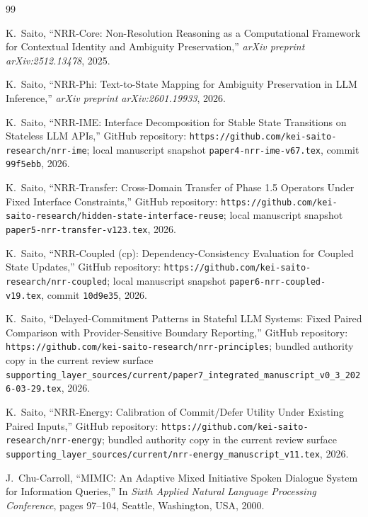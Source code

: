 \documentclass[11pt]{article}
\begin{document}
\begin{thebibliography}{99}
\raggedright

K.~Saito,
\newblock ``NRR-Core: Non-Resolution Reasoning as a Computational Framework for Contextual Identity and Ambiguity Preservation,''
\newblock \emph{arXiv preprint arXiv:2512.13478}, 2025.

K.~Saito,
\newblock ``NRR-Phi: Text-to-State Mapping for Ambiguity Preservation in LLM Inference,''
\newblock \emph{arXiv preprint arXiv:2601.19933}, 2026.

K.~Saito,
\newblock ``NRR-IME: Interface Decomposition for Stable State Transitions on Stateless LLM APIs,''
\newblock GitHub repository: \texttt{https://github.com/kei-saito-research/nrr-ime}; local manuscript snapshot \texttt{paper4-nrr-ime-v67.tex}, commit \texttt{99f5ebb}, 2026.

K.~Saito,
\newblock ``NRR-Transfer: Cross-Domain Transfer of Phase 1.5 Operators Under Fixed Interface Constraints,''
\newblock GitHub repository: \texttt{https://github.com/kei-saito-research/hidden-state-interface-reuse}; local manuscript snapshot \texttt{paper5-nrr-transfer-v123.tex}, 2026.

K.~Saito,
\newblock ``NRR-Coupled (cp): Dependency-Consistency Evaluation for Coupled State Updates,''
\newblock GitHub repository: \texttt{https://github.com/kei-saito-research/nrr-coupled}; local manuscript snapshot \texttt{paper6-nrr-coupled-v19.tex}, commit \texttt{10d9e35}, 2026.

K.~Saito,
\newblock ``Delayed-Commitment Patterns in Stateful LLM Systems: Fixed Paired Comparison with Provider-Sensitive Boundary Reporting,''
\newblock GitHub repository: \texttt{https://github.com/kei-saito-research/nrr-principles}; bundled authority copy in the current review surface \texttt{supporting\_layer\_sources/current/paper7\_integrated\_manuscript\_v0\_3\_2026-03-29.tex}, 2026.

K.~Saito,
\newblock ``NRR-Energy: Calibration of Commit/Defer Utility Under Existing Paired Inputs,''
\newblock GitHub repository: \texttt{https://github.com/kei-saito-research/nrr-energy}; bundled authority copy in the current review surface \texttt{supporting\_layer\_sources/current/nrr-energy\_manuscript\_v11.tex}, 2026.

J.~Chu-Carroll,
\newblock ``MIMIC: An Adaptive Mixed Initiative Spoken Dialogue System for Information Queries,''
\newblock In \emph{Sixth Applied Natural Language Processing Conference}, pages 97--104, Seattle, Washington, USA, 2000.


\end{thebibliography}
\end{document}
